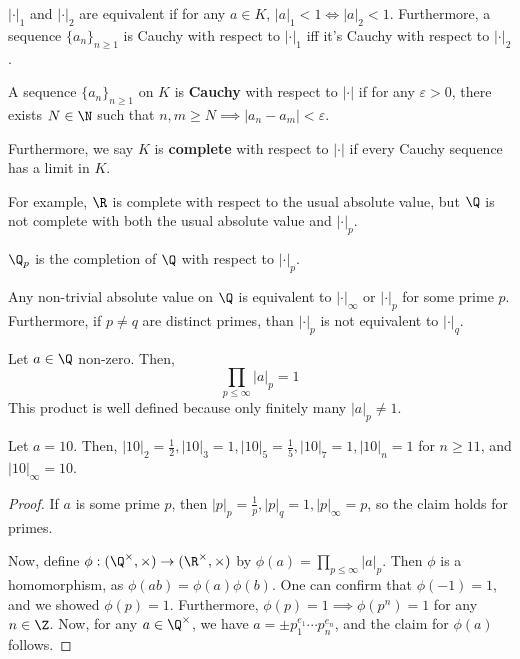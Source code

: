\begin{prop}
    $|\cdot |_1$ and $|\cdot |_2$ are equivalent if for any $a \in K$, $|a|_1 < 1 \iff |a|_2 < 1$. Furthermore, a sequence $\{a_n\}_{n \geq 1}$ is Cauchy with respect to $|\cdot |_1$ iff it's Cauchy with respect to $|\cdot |_2$.
\end{prop}

\begin{defn}
    A sequence $\{a_n\}_{n\geq 1}$ on $K$ is \textbf{Cauchy} with respect to $|\cdot |$ if for any $\varepsilon>0$, there exists $N \in \N$ such that $n,m\geq N \implies |a_n-a_m| < \varepsilon$.

    Furthermore, we say $K$ is \textbf{complete} with respect to $|\cdot |$ if every Cauchy sequence has a limit in $K$.
\end{defn}

For example, $\R$ is complete with respect to the usual absolute value, but $\Q$ is not complete with both the usual absolute value and $|\cdot |_p$.

\begin{thm}
    $\Q_p$ is the completion of $\Q$ with respect to $|\cdot |_p$.
\end{thm}

\begin{thm}
    Any non-trivial absolute value on $\Q$ is equivalent to $|\cdot |_\infty$ or $|\cdot |_p$ for some prime $p$. Furthermore, if $p \neq q$ are distinct primes, than $|\cdot |_p$ is not equivalent to $|\cdot |_q$.
\end{thm}

\begin{thm}
    Let $a \in \Q$ non-zero. Then,
    $$\prod_{p \leq \infty}|a|_p=1$$
    This product is well defined because only finitely many $|a|_p \neq 1$.
\end{thm}

\begin{ex}
    Let $a=10$. Then, $|10|_2=\frac 12,|10|_3=1,|10|_5=\frac 15,|10|_7=1,|10|_n=1$ for $n \geq 11$, and $|10|_\infty =10$.
\end{ex}

\begin{proof}
    If $a$ is some prime $p$, then $|p|_p=\frac 1p,|p|_q=1,|p|_\infty=p$, so the claim holds for primes.

    Now, define $\phi:(\Q^\times,\times) \to (\R^\times,\times)$ by $\phi(a)=\prod_{p \leq \infty}|a|_p$. Then $\phi$ is a homomorphism, as $\phi(ab)=\phi(a)\phi(b)$. One can confirm that $\phi(-1)=1$, and we showed $\phi(p)=1$. Furthermore, $\phi(p)=1 \implies \phi(p^n)=1$ for any $n \in \Z$. Now, for any $a \in \Q^\times$, we have $a = \pm p_1^{e_1}\cdots p_n^{e_n}$, and the claim for $\phi(a)$ follows.
\end{proof}

